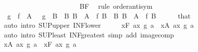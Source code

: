 \begin{isabellebody}
\ \ \ \ \ \ \ \ \ \ \ \ \ \ \ \ \ \ \ \ {\isacharparenleft}{\kern0pt}\ {\isachardoublequoteopen}{\isacharunderscore}{\kern0pt}\ {\isacharequal}{\kern0pt}\ {\isacharparenleft}{\kern0pt}{\isasymSqunion}B{\isasymin}{\isacharquery}{\kern0pt}F{\isachardot}{\kern0pt}\ {\isacharunderscore}{\kern0pt}{\isacharparenright}{\kern0pt}{\isachardoublequoteclose}{\isacharparenright}{\kern0pt}\isanewline
%
\isadelimproof
%
\endisadelimproof
%
\isatagproof
{}\isamarkupfalse%
\ {\isacharparenleft}{\kern0pt}rule\ order{\isachardot}{\kern0pt}antisym{\isacharparenright}{\kern0pt}\isanewline
\ \ \isamarkupfalse%
\ {\isachardoublequoteopen}{\isasymSqinter}\ {\isacharparenleft}{\kern0pt}{\isacharparenleft}{\kern0pt}g\ {\isasymcirc}\ f{\isacharparenright}{\kern0pt}\ {\isacharbackquote}{\kern0pt}\ A{\isacharparenright}{\kern0pt}\ {\isasymle}\ {\isasymSqunion}\ {\isacharparenleft}{\kern0pt}g\ {\isacharbackquote}{\kern0pt}\ B{\isacharparenright}{\kern0pt}{\isachardoublequoteclose}\ \ {\isachardoublequoteopen}{\isasymAnd}B{\isachardot}{\kern0pt}\ B\ {\isasymin}\ A\ {\isasymLongrightarrow}\ f\ B\ {\isasymin}\ B{\isachardoublequoteclose}\ {\isachardoublequoteopen}B\ {\isasymin}\ A{\isachardoublequoteclose}\ \ f\ B\isanewline
\ \ \ \ \isamarkupfalse%
\ that\ \isamarkupfalse%
\ {\isacharparenleft}{\kern0pt}auto\ intro{\isacharcolon}{\kern0pt}\ SUP{\isacharunderscore}{\kern0pt}upper{}\ INF{\isacharunderscore}{\kern0pt}lower{}{\isacharparenright}{\kern0pt}\isanewline
\ \ \isamarkupfalse%
\ \isamarkupfalse%
\ {\isachardoublequoteopen}{\isacharparenleft}{\kern0pt}{\isasymSqunion}x{\isasymin}{\isacharquery}{\kern0pt}F{\isachardot}{\kern0pt}\ {\isasymSqinter}a{\isasymin}x{\isachardot}{\kern0pt}\ g\ a{\isacharparenright}{\kern0pt}\ {\isasymle}\ {\isacharparenleft}{\kern0pt}{\isasymSqinter}x{\isasymin}A{\isachardot}{\kern0pt}\ {\isasymSqunion}a{\isasymin}x{\isachardot}{\kern0pt}\ g\ a{\isacharparenright}{\kern0pt}{\isachardoublequoteclose}\isanewline
\ \ \ \ \isamarkupfalse%
\ {\isacharparenleft}{\kern0pt}auto\ intro{\isacharbang}{\kern0pt}{\isacharcolon}{\kern0pt}\ SUP{\isacharunderscore}{\kern0pt}least\ INF{\isacharunderscore}{\kern0pt}greatest\ simp\ add{\isacharcolon}{\kern0pt}\ image{\isacharunderscore}{\kern0pt}comp{\isacharparenright}{\kern0pt}\isanewline
{}\isamarkupfalse%
\isanewline
\ \ \isamarkupfalse%
\ {\isachardoublequoteopen}{\isacharparenleft}{\kern0pt}{\isasymSqinter}x{\isasymin}A{\isachardot}{\kern0pt}\ {\isasymSqunion}a{\isasymin}x{\isachardot}{\kern0pt}\ g\ a{\isacharparenright}{\kern0pt}\ {\isasymle}\ {\isacharparenleft}{\kern0pt}{\isasymSqunion}x{\isasymin}{\isacharquery}{\kern0pt}F{\isachardot}{\kern0pt}\ {\isasymSqinter}a{\isasymin}x{\isachardot}{\kern0pt}\ g\ a{\isacharparenright}{\kern0pt}{\isachardoublequoteclose}\isanewline

\end{isabellebody}
